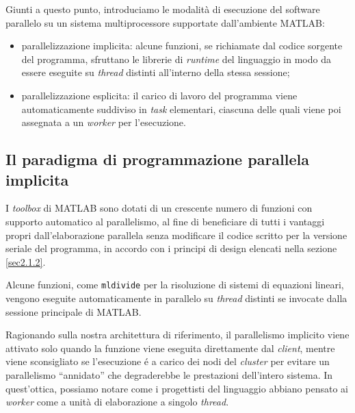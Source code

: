 Giunti a questo punto, introduciamo le modalit\`a di esecuzione del software parallelo su un sistema multiprocessore supportate dall'ambiente MATLAB:
\begin{itemize}
    \item parallelizzazione implicita: alcune funzioni, se richiamate dal codice sorgente del programma, sfruttano le librerie di \textit{runtime} del linguaggio 
    in modo da essere eseguite su \textit{thread} distinti all'interno della stessa sessione;
    \item parallelizzazione esplicita: il carico di lavoro del programma viene automaticamente suddiviso in \textit{task} elementari, ciascuna delle quali viene 
    poi assegnata a un \textit{worker} per l'esecuzione.
\end{itemize}

\nocite{MathWorksParallelQuickStart}
\subsection{Il paradigma di programmazione parallela implicita}
I \textit{toolbox} di MATLAB sono dotati di un crescente numero di funzioni con supporto automatico al parallelismo, al fine di beneficiare di tutti 
i vantaggi propri dall'elaborazione parallela senza modificare il codice scritto per la versione seriale del programma, in accordo con i principi di design elencati 
nella sezione \ref{sec2.1.2}. 

Alcune funzioni, come \lstinline|mldivide| per la risoluzione di sistemi di equazioni lineari, vengono eseguite automaticamente in parallelo su \textit{thread} 
distinti se invocate dalla sessione principale di MATLAB. 

Ragionando sulla nostra architettura di riferimento, il parallelismo implicito viene attivato solo quando la funzione viene eseguita direttamente dal \textit{client}, 
mentre viene sconsigliato se l'esecuzione \'e a carico dei nodi del \textit{cluster} per evitare un parallelismo \enquote{annidato} che degraderebbe le prestazioni 
dell'intero sistema. \newline
In quest'ottica, possiamo notare come i progettisti del linguaggio abbiano pensato ai \textit{worker} come a unit\`a di elaborazione a singolo \textit{thread}.

